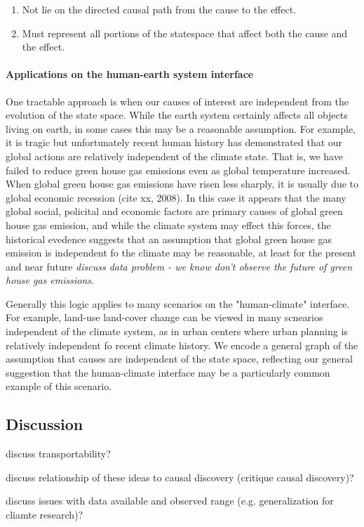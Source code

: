 \documentclass[12pt]{article}
\begin{document}
\begin{enumerate}
\item Not lie on the directed causal path from the cause to the
effect.

\item Must represent all portions of the statespace that affect both
the cause and the effect.
\end{enumerate}


\paragraph{Applications on the human-earth system interface}



One tractable approach is when our causes of interest are independent
from the evolution of the state space. While the earth system
certainly affects all objects living on earth, in some cases this may
be a reasonable assumption. For example, it is tragic but
unfortunately recent human history has demonstrated that our global
actions are relatively independent of the climate state. That is, we
have failed to reduce green house gas emissions even as global
temperature increased. When global green house gas emissions have
risen less sharply, it is usually due to global economic recession
(cite xx, 2008). In this case it appears that the many global social,
policital and economic factors are primary causes of global green
house gas emission, and while the climate system may effect this
forces, the historical evedence suggests that an assumption that
global green house gas emission is independent fo the climate may be
reasonable, at least for the present and near future \emph{discuss
  data problem - we know don't observe the future of green house gas
  emissions}.

Generally this logic applies to many scenarios on the
"human-climate" interface. For example, land-use land-cover change
can be viewed in many scnearios independent of the climate system,
as in urban centers where urban planning is relatively independent
fo recent climate history. We encode a general graph of the
assumption that causes are independent of the state space,
reflecting our general suggestion that the human-climate interface
may be a particularly common example of this scenario.



\subsection{Discussion}

discuss transportability?

discuss relationship of these ideas to causal discovery (critique
causal discovery)?

discuss issues with data available and observed range
(e.g. generalization for cliamte research)?


\end{document}
